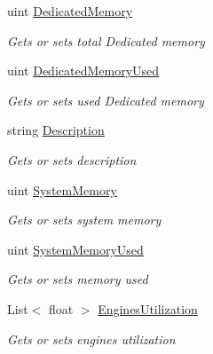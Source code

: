 \begin{DoxyCompactItemize}
\item 
uint \hyperlink{class_microsoft_1_1_tools_1_1_windows_device_portal_1_1_device_portal_1_1_gpu_adapter_a8f3fe76594525d4c27d94beced83612b}{Dedicated\+Memory}
\begin{DoxyCompactList}\small\item\em Gets or sets total Dedicated memory \end{DoxyCompactList}\item 
uint \hyperlink{class_microsoft_1_1_tools_1_1_windows_device_portal_1_1_device_portal_1_1_gpu_adapter_a23b29335ffde57bfb6f5b1d12309498b}{Dedicated\+Memory\+Used}
\begin{DoxyCompactList}\small\item\em Gets or sets used Dedicated memory \end{DoxyCompactList}\item 
string \hyperlink{class_microsoft_1_1_tools_1_1_windows_device_portal_1_1_device_portal_1_1_gpu_adapter_a3255a76d4b2f96f82a3f5e925b1baf50}{Description}
\begin{DoxyCompactList}\small\item\em Gets or sets description \end{DoxyCompactList}\item 
uint \hyperlink{class_microsoft_1_1_tools_1_1_windows_device_portal_1_1_device_portal_1_1_gpu_adapter_a626b502b200b65271325de7e7d150941}{System\+Memory}
\begin{DoxyCompactList}\small\item\em Gets or sets system memory \end{DoxyCompactList}\item 
uint \hyperlink{class_microsoft_1_1_tools_1_1_windows_device_portal_1_1_device_portal_1_1_gpu_adapter_a64c1c59a2e36f629ed512fb014c4da9b}{System\+Memory\+Used}
\begin{DoxyCompactList}\small\item\em Gets or sets memory used \end{DoxyCompactList}\item 
List$<$ float $>$ \hyperlink{class_microsoft_1_1_tools_1_1_windows_device_portal_1_1_device_portal_1_1_gpu_adapter_a384e869b00d5a7b9a6885a70fd38e340}{Engines\+Utilization}
\begin{DoxyCompactList}\small\item\em Gets or sets engines utilization \end{DoxyCompactList}\end{DoxyCompactItemize}


